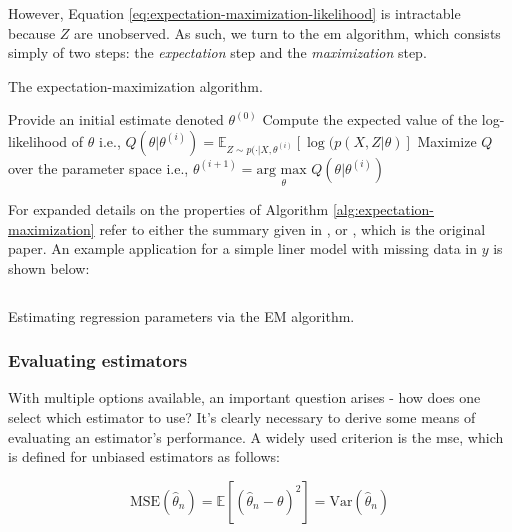 \documentclass{report}
\begin{document}
However, Equation \ref{eq:expectation-maximization-likelihood} is intractable because $Z$ are unobserved. As such, we turn to the \gls{em} algorithm, which consists simply of two steps: the \textit{expectation} step and the \textit{maximization} step. 

\begin{algorithm}[h!]
    \caption{The expectation-maximization algorithm.}\label{alg:expectation-maximization}
    \begin{algorithmic}[1]
        \STATE Provide an initial estimate denoted $\theta^{(0)}$
            \STATE Compute the expected value of the log-likelihood of $\theta$ i.e., $Q(\theta | \theta^{(i)}) = \mathbb{E}_{Z\sim p(\cdot | X, \theta^{(i)}}\left[\log(p(X,Z|\theta)\right]$
            \STATE Maximize $Q$ over the parameter space i.e., $\theta^{(i+1)} = \underset{\theta}{\text{arg max }} Q(\theta | \theta^{(i)})$
        \ENDFOR
    \end{algorithmic}
\end{algorithm}

For expanded details on the properties of Algorithm \ref{alg:expectation-maximization} refer to either the summary given in \cite[Chapter~7.2.4]{casella_statistical_2002}, or \cite{dempster_maximum_1977}, which is the original paper. An example application for a simple liner model with missing data in $y$ is shown below:

\begin{listing}[H]
\inputminted{r}{Example-Code/em_algorithm.R}
\caption{Estimating regression parameters via the EM algorithm.}
\label{listing:em-algorithm-example}
\end{listing}

\subsubsection{Evaluating estimators}

With multiple options available, an important question arises - how does one select which estimator to use? It's clearly necessary to derive some means of evaluating an estimator's performance. A widely used criterion is the \gls{mse}, which is defined for unbiased estimators as follows:

\begin{equation}\label{eq:mse}
    \text{MSE}\left(\hat{\theta}_n\right) = \mathbb{E}\left[\left(\hat{\theta}_n - \theta\right)^2\right] = \text{Var}\left(\hat{\theta}_n\right)
\end{equation}
\end{document}
